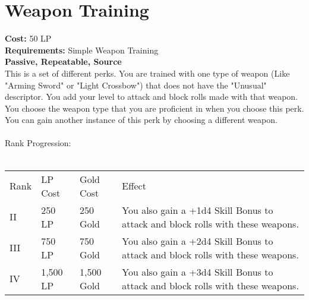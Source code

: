 \section{Weapon Training}\label{perk:weaponTraining}
\textbf{Cost:} 50 LP\\
\textbf{Requirements:} Simple Weapon Training\\
\textbf{Passive, Repeatable, Source}\\
This is a set of different perks.
You are trained with one type of weapon (Like "Arming Sword" or "Light Crossbow") that does not have the "Unusual" descriptor.
You add your level to attack and block rolls made with that weapon.\\
You choose the weapon type that you are proficient in when you choose this perk.
You can gain another instance of this perk by choosing a different weapon.\\
\\
Rank Progression:\\
\\
\begin{longtable}{l | l | l | p{9cm}}
	Rank & LP Cost & Gold Cost & Effect\\
	II & 250 LP & 250 Gold & You also gain a +1d4 Skill Bonus to attack and block rolls with these weapons.\\
	III & 750 LP & 750 Gold & You also gain a +2d4 Skill Bonus to attack and block rolls with these weapons.\\
	IV & 1,500 LP & 1,500 Gold & You also gain a +3d4 Skill Bonus to attack and block rolls with these weapons.\\
\end{longtable}